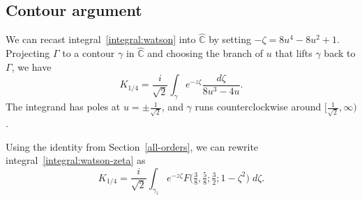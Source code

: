 \documentclass{article}
\newcommand{\C}{\mathbb{C}}
\begin{document}
\subsection{Contour argument}\label{contour-argument}
We can recast integral~\ref{integral:watson} into $\hat{\C}$ by setting $-\zeta = 8u^4 - 8u^2 + 1$. Projecting $\Gamma$ to a contour $\gamma$ in $\hat{\C}$ and choosing the branch of $u$ that lifts $\gamma$ back to $\Gamma$, we have
\begin{equation}\label{integral:watson-zeta}
K_{1/4} = \frac{i}{\sqrt{2}} \int_\gamma e^{-z\zeta}\frac{d\zeta}{8u^3 - 4u}.
\end{equation}
The integrand has poles at $u = \pm\tfrac{1}{\sqrt{2}}$, and $\gamma$ runs counterclockwise around $\big[\tfrac{1}{\sqrt{2}}, \infty\big)$.

Using the identity from Section~\ref{all-orders}, we can rewrite integral~\ref{integral:watson-zeta} as
\[ K_{1/4} = \frac{i}{\sqrt{2}} \int_{\gamma_z} e^{-z\zeta} F\big(\tfrac{3}{8}, \tfrac{5}{8}; \tfrac{3}{2}; 1 - \zeta^2\big)\;d\zeta. \]


\end{document}
